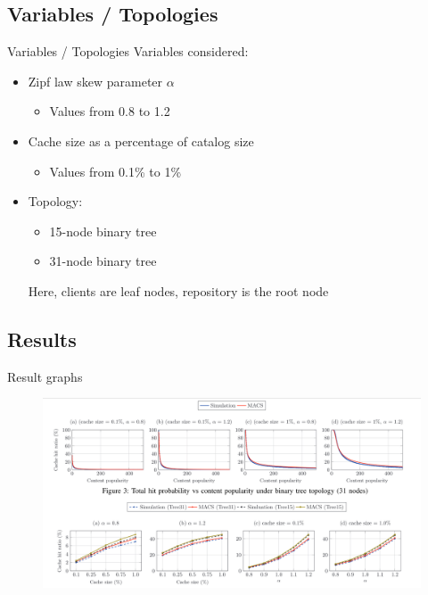 \documentclass[
	xcolor={svgnames},
	hyperref={pagebackref,bookmarks},
	aspectratio=43,
]{beamer}
\begin{document}
\subsection*{Variables / Topologies}
\begin{frame}{Variables / Topologies}
    Variables considered: 
    \begin{itemize}
        \item Zipf law skew parameter $\alpha$
        \begin{itemize}
            \item Values from 0.8 to 1.2
        \end{itemize}
        \item Cache size as a percentage of catalog size
        \begin{itemize}
            \item Values from 0.1\% to 1\%
        \end{itemize}
        \item Topology:
        \begin{itemize}
            \item 15-node binary tree
            \item 31-node binary tree
        \end{itemize}
        Here, clients are leaf nodes, repository is the root node
    \end{itemize}
\end{frame}

\subsection*{Results}
\begin{frame}{Result graphs}
    \begin{figure}
        \centering
        \includegraphics[scale=0.215]{benammarsimresults.png}
    \end{figure}
\end{frame}
\end{document}
